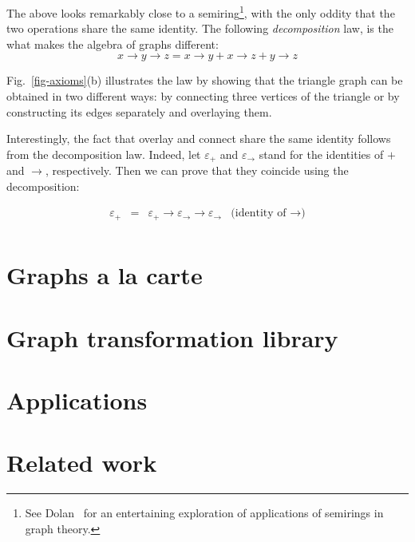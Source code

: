 \documentclass[acmlarge,anonymous]{acmart}\settopmatter{printfolios=true}
\begin{document}
\noindent
The above looks remarkably close to a semiring\footnote{
See Dolan~\citeyear{2013_semirings_dolan} for an entertaining exploration of
applications of semirings in graph theory.}, with the only oddity that the two
operations share the same identity. The following \emph{decomposition} law, is
the what makes the algebra of graphs different:
\[
x \rightarrow y \rightarrow z = x \rightarrow y + x \rightarrow z + y \rightarrow z
\]

\noindent
Fig.~\ref{fig-axioms}(b) illustrates the law by showing that the triangle
graph can be obtained in two different ways: by connecting three vertices
of the triangle or by constructing its edges separately and overlaying them.

Interestingly, the fact that overlay and connect share the same identity
follows from the decomposition law. Indeed, let $\varepsilon_{+}$ and
$\varepsilon_{\rightarrow}$ stand for the identities of $+$ and $\rightarrow$,
respectively. Then we can prove that they coincide using the decomposition:

\[
\begin{array}{rcll}
\varepsilon_{+} & = & \varepsilon_{+} \rightarrow \varepsilon_{\rightarrow} \rightarrow \varepsilon_{\rightarrow} & \text{(identity of $\rightarrow$)}\\
\end{array}
\]

\section{Graphs a la carte}\label{sec-a-la-carte}

\section{Graph transformation library}\label{sec-transformations}

\section{Applications}\label{sec-applications}

\section{Related work}\label{sec-related}

\end{document}
